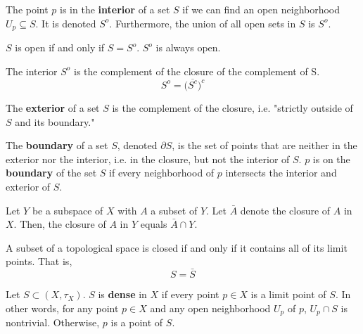 \documentclass{article}
\begin{document}
    \begin{definition}
    The point $p$ is in the \textbf{interior} of a set $S$ if we can find an open neighborhood $U_p \subseteq S$. It is denoted $S^{o}$. Furthermore, the union of all open sets in $S$ is $S^{o}$. 
    \end{definition}

    \begin{proposition}
    $S$ is open if and only if $S = S^{o}$. $S^{o}$ is always open.
    \end{proposition}

    \begin{theorem}
    The interior $S^{o}$ is the complement of the closure of the complement of S. \[ S^{o} = \big(\overline{S^{c}}\big)^{c}\]
    \end{theorem}

    \begin{definition}
    The \textbf{exterior} of a set $S$ is the complement of the closure, i.e. "strictly outside of $S$ and its boundary."
    \end{definition}

    \begin{definition}
    The \textbf{boundary} of a set $S$, denoted $\partial S$, is the set of points that are neither in the exterior nor the interior, i.e. in the closure, but not the interior of $S$. $p$ is on the \textbf{boundary} of the set $S$ if every neighborhood of $p$ intersects the interior and exterior of $S$.  
    \end{definition}

    \begin{theorem}
    Let $Y$ be a subspace of $X$ with $A$ a subset of $Y$. Let $\bar{A}$ denote the closure of $A$ in $X$. Then, the closure of $A$ in $Y$ equals $\bar{A} \cap Y$. 
    \end{theorem}

    \begin{theorem}
    A subset of a topological space is closed if and only if it contains all of its limit points. That is, 
    \[S = \bar{S}\]
    \end{theorem}

    \begin{definition}
    Let $S \subset (X, \tau_X)$. $S$ is \textbf{dense} in $X$ if every point $p \in X$ is a limit point of $S$. In other words, for any point $p \in X$ and any open neighborhood $U_p$ of $p$, $U_p \cap S$ is nontrivial. Otherwise, $p$ is a point of $S$. 
    \end{definition}
\end{document}
